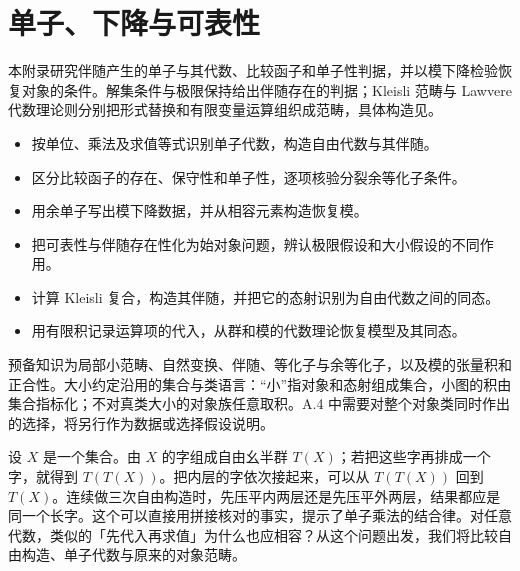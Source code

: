 

\chapter{单子、下降与可表性}
\label{b4:app:A}

\begin{chapterabstract}
	本附录研究伴随产生的单子与其代数、比较函子和单子性判据，并以模下降检验恢复对象的条件。解集条件与极限保持给出伴随存在的判据；Kleisli 范畴与 Lawvere 代数理论则分别把形式替换和有限变量运算组织成范畴，具体构造见。
\end{chapterabstract}

\begin{learninggoals}
	\begin{itemize}
		\item 按单位、乘法及求值等式识别单子代数，构造自由代数与其伴随。
		\item 区分比较函子的存在、保守性和单子性，逐项核验分裂余等化子条件。
		\item 用余单子写出模下降数据，并从相容元素构造恢复模。
		\item 把可表性与伴随存在性化为始对象问题，辨认极限假设和大小假设的不同作用。
		\item 计算 Kleisli 复合，构造其伴随，并把它的态射识别为自由代数之间的同态。
		\item 用有限积记录运算项的代入，从群和模的代数理论恢复模型及其同态。
	\end{itemize}
	预备知识为局部小范畴、自然变换、伴随、等化子与余等化子，以及模的张量积和正合性。大小约定沿用的集合与类语言：“小”指对象和态射组成集合，小图的积由集合指标化；不对真类大小的对象族任意取积。A.4 中需要对整个对象类同时作出的选择，将另行作为数据或选择假设说明。
\end{learninggoals}

设 \(X\) 是一个集合。由 \(X\) 的字组成自由幺半群 \(T(X)\)；若把这些字再排成一个字，就得到 \(T(T(X))\)。把内层的字依次接起来，可以从 \(T(T(X))\) 回到 \(T(X)\)。连续做三次自由构造时，先压平内两层还是先压平外两层，结果都应是同一个长字。这个可以直接用拼接核对的事实，提示了单子乘法的结合律。对任意代数，类似的「先代入再求值」为什么也应相容？从这个问题出发，我们将比较自由构造、单子代数与原来的对象范畴。

